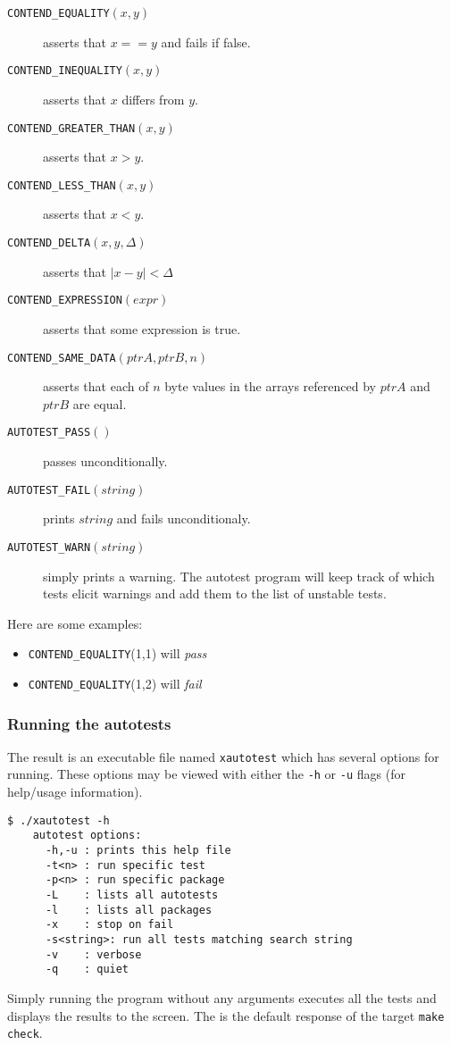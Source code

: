 \begin{description}
\item[{\tt CONTEND\_EQUALITY}$(x,y)$] asserts that $x==y$ and fails if
false.
\item[{\tt CONTEND\_INEQUALITY}$(x,y)$] asserts that $x$ differs from
$y$.
\item[{\tt CONTEND\_GREATER\_THAN}$(x,y)$] asserts that $x>y$.
\item[{\tt CONTEND\_LESS\_THAN}$(x,y)$] asserts that $x<y$.
\item[{\tt CONTEND\_DELTA}$(x,y,\Delta)$] asserts that $|x-y|<\Delta$
\item[{\tt CONTEND\_EXPRESSION}$(expr)$] asserts that some expression is
true.
\item[{\tt CONTEND\_SAME\_DATA}$(ptrA,ptrB,n)$] asserts that each of $n$
byte values in the arrays referenced by $ptrA$ and $ptrB$ are equal.
\item[{\tt AUTOTEST\_PASS}$()$] passes unconditionally.
\item[{\tt AUTOTEST\_FAIL}$(string)$] prints $string$ and fails
unconditionaly.
\item[{\tt AUTOTEST\_WARN}$(string)$] simply prints a warning.
The autotest program will keep track of which tests elicit warnings and add
them to the list of unstable tests.
\end{description}

Here are some examples:
\begin{itemize}
\item[] {\tt CONTEND\_EQUALITY}(1,1) will {\it pass}
\item[] {\tt CONTEND\_EQUALITY}(1,2) will {\it fail}
\end{itemize}

\subsubsection{Running the autotests}
The result is an executable file named {\tt xautotest} which has several
options for running.
These options may be viewed with either the {\tt -h} or {\tt -u} flags (for
help/usage information).
%
\begin{Verbatim}[fontsize=\small]
    $ ./xautotest -h
    autotest options:
      -h,-u : prints this help file
      -t<n> : run specific test
      -p<n> : run specific package
      -L    : lists all autotests
      -l    : lists all packages
      -x    : stop on fail
      -s<string>: run all tests matching search string
      -v    : verbose
      -q    : quiet
\end{Verbatim}
%
Simply running the program without any arguments executes all the tests and
displays the results to the screen.
The is the default response of the target {\tt make check}.

